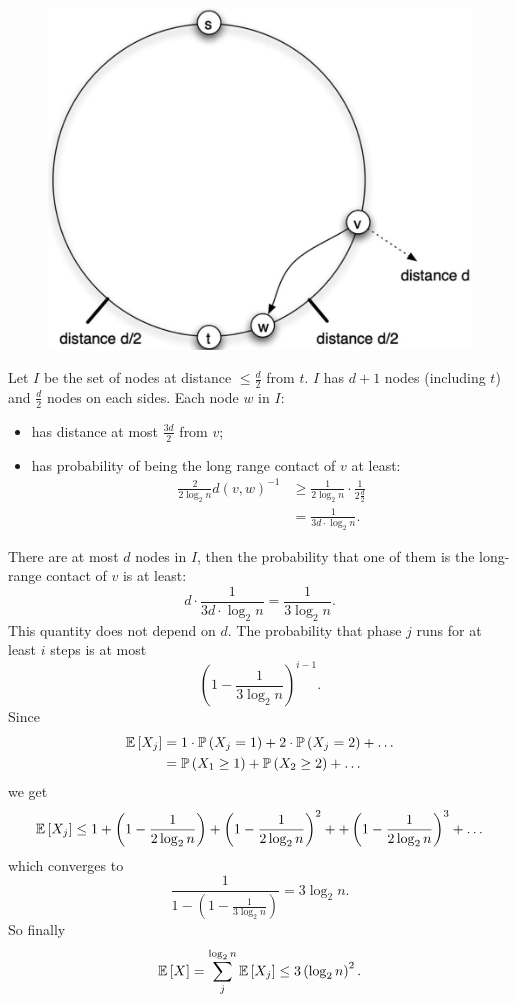 \documentclass[a4paper,9pt]{extarticle}
\begin{document}
\begin{multicols*}{2}
\begin{figure}[H]
		\centering
		\includegraphics[width=0.7\linewidth]{screenshot007}
		\label{fig:screenshot007}
	\end{figure}
	Let $I$ be the set of nodes at distance $\leq\frac{d}{2}$ from $t$. $I$ has $d+1$ nodes (including $t$) and $\frac{d}{2}$ nodes on each sides. Each node $w$ in $I$:
	\begin{itemize}
		\item has distance at most $\frac{3d}{2}$ from $v$;
		\item has probability of being the long range contact of $v$ at least:
		\begin{align*}
			\frac{2}{2\log_{2}n}d(v,w)^{-1}&\geq\frac{1}{2\log_{2}n}\cdot\frac{1}{2\frac{d}{2}}\\
			&=\frac{1}{3d\cdot\log_{2}n}.
		\end{align*}
	\end{itemize}
	There are at most $d$ nodes in $I$, then the probability that one of them is the long-
	range contact of $v$ is at least:
	\begin{equation*}
		d\cdot\frac{1}{3d\cdot\log_{2}n}=\frac{1}{3\log_{2}n}.
	\end{equation*}
	This quantity does not depend on $d$. The probability that phase $j$ runs for at least $i$ steps is at most
	\begin{equation*}
		\left(1-\frac{1}{3\log_{2}n}\right)^{i-1}.
	\end{equation*}
	Since
	\begin{align*}
		\mathbb{E}\left[X_{j}\right]&=1\cdot\mathbb{P}\left(X_{j}=1\right)+2\cdot\mathbb{P}\left(X_{j}=2\right)+\ldots\\
		&=\mathbb{P}\left(X_{1}\geq 1\right)+\mathbb{P}\left(X_{2}\geq 2\right)+\ldots
	\end{align*}
	we get
	\begin{equation*}
		\mathbb{E}\left[X_{j}\right]\leq1+\left(1-\frac{1}{2\log_{2}n}\right)+\left(1-\frac{1}{2\log_{2}n}\right)^{2}++\left(1-\frac{1}{2\log_{2}n}\right)^{3}+\ldots
	\end{equation*}
	which converges to
	\begin{equation*}
		\frac{1}{1-\left(1-\frac{1}{3\log_{2}n}\right)}=3\log_{2}n.
	\end{equation*}
	So finally
	\begin{equation*}
		\mathbb{E}\left[X\right]=\sum_{j}^{\log_{2}n}\mathbb{E}\left[X_{j}\right]\leq3\left(\log_{2}n\right)^{2}.
	\end{equation*}

\end{multicols*}
\end{document}
